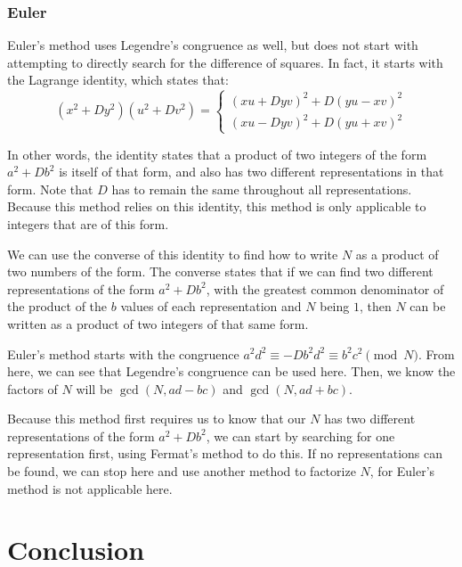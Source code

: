 \documentclass{article}
\begin{document}
\subsubsection*{Euler}
\par Euler's method uses Legendre's congruence as well, but does not start with attempting to directly search for the
difference of squares. In fact, it starts with the Lagrange identity, which states that:
$$(x^2+Dy^2)(u^2+Dv^2) = \begin{cases} (xu+Dyv)^2 + D(yu-xv)^2 \\
    (xu - Dyv)^2 + D(yu+xv)^2 \end{cases}$$

\par In other words, the identity states that a product of two integers of the form $a^2+Db^2$ is itself of that form,
and also has two different representations in that form. Note that $D$ has to remain the same throughout all representations.
Because this method relies on this identity, this method is only applicable to integers that are of this form.

\par We can use the converse of this identity to find how to write $N$ as a product of two numbers of the form. The converse
states that if we can find two different representations of the form $a^2+Db^2$, with the greatest common denominator of the product of the $b$
values of each representation and $N$ being $1$, then $N$ can be written as a product of two integers of that same form.

\par Euler's method starts with the congruence $a^2d^2 \equiv -Db^2d^2 \equiv b^2c^2 \pmod{N}$. From here, we can see that
Legendre's congruence can be used here. Then, we know the factors of $N$ will be $\gcd(N, ad-bc)$ and $\gcd(N,ad+bc)$.

\par Because this method first requires us to know that our $N$ has two different representations of the form $a^2+Db^2$,
we can start by searching for one representation first, using Fermat's method to do this. If no representations can
be found, we can stop here and use another method to factorize $N$, for Euler's method is not applicable here.


\section{Conclusion}\label{Conclusion}
\end{document}
